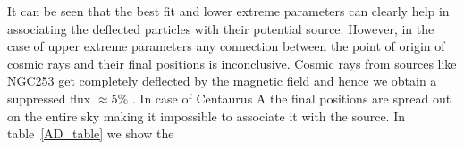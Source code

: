 \documentclass[12pt, a4 paper]{mnras}
\begin{document}
It can be seen that the best fit and lower extreme parameters can clearly help in associating the deflected particles with their potential source. However, in the case of upper extreme parameters any connection between the point of origin of cosmic rays and their final positions is inconclusive. Cosmic rays from  sources like NGC253 get completely deflected by the magnetic field and hence we obtain a suppressed flux $\approx 5\%$ . In case of Centaurus A the final positions are spread out on the entire sky making it impossible to associate it with the source. In table~{\ref{AD_table}} we show the 








\end{document}
